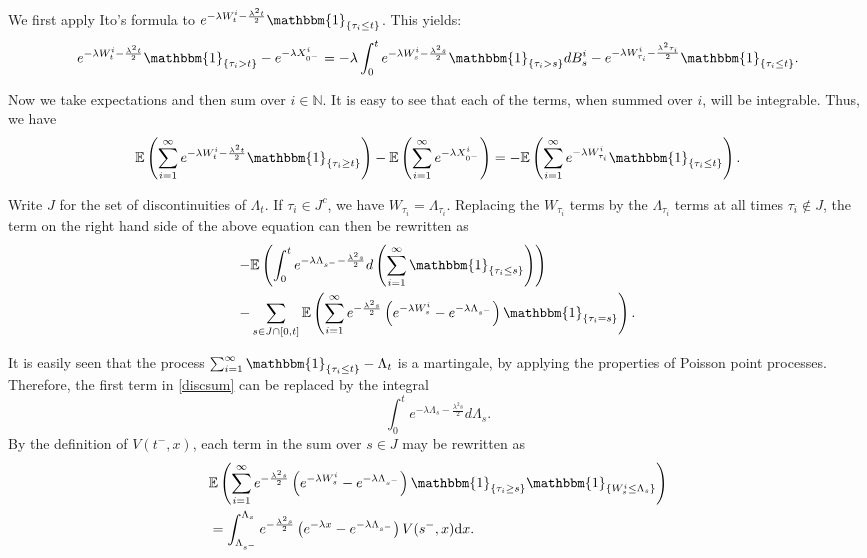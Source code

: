 \documentclass[11pt]{article}
\theoremstyle{plain}
\theoremstyle{remark}
\theoremstyle{definition}
\numberwithin{equation}{section}
\begin{document}
We first apply Ito's formula to $e^{-\lambda W_t^i-\frac{\lambda^2t}{2}}\mathbbm{1}_{\{\tau_i\leq t\}}$. This yields:
\begin{align*}
    e^{-\lambda W_t^i-\frac{\lambda^2t}{2}}\mathbbm{1}_{\{\tau_i>t\}}-e^{-\lambda X_{0^-}^i}=-\lambda \int_0^t e^{-\lambda W_s^i-\frac{\lambda^2s}{2}}\mathbbm{1}_{\{\tau_i> s\}}dB_s^i-e^{-\lambda W_{\tau_i}^i-\frac{\lambda^2\tau_i}{2}}\mathbbm{1}_{\{\tau_i\leq t\}}.
\end{align*}

Now we take expectations and then sum over $i\in \mathbb{N}$. It is easy to see that each of the terms, when summed over $i$, will be integrable. Thus, we have
\begin{align}
\label{itoterm2}
\mathbb{E}\left(\sum_{i=1}^\infty e^{-\lambda W_t^i-\frac{\lambda^2t}{2}}\mathbbm{1}_{\{\tau_i\geq t\}}\right)-\mathbb{E}\left(\sum_{i=1}^\infty e^{-\lambda X_{0^-}^i}\right)=-\mathbb{E}\left(\sum_{i=1
}^\infty e^{-\lambda W_{\tau_i}^i}\mathbbm{1}_{\{\tau_i\leq t\}}\right).
\end{align}

Write $J$ for the set of discontinuities of $\Lambda_t$.
If $\tau_i\in J^c$, we have $W_{\tau_i}=\Lambda_{\tau_i}$. Replacing the $W_{\tau_i}$ terms by the $\Lambda_{\tau_i}$ terms at all times $\tau_i\notin J$, the term on the right hand side of the above equation can then be rewritten as 
\begin{align}
\label{discsum}-&\mathbb{E}\left(\int_0^te^{-\lambda \Lambda_{s^-}-\frac{\lambda^2s}{2}}d\left(\sum_{i=1}^\infty \mathbbm{1}_{\{\tau_i\leq s\}}\right)\right)\\-&\sum_{s\in J\cap[0,t]}\mathbb{E}\left(\sum_{i=1}^\infty e^{-\frac{\lambda^2s}{2}}\left(e^{-\lambda W_{s}^i}-e^{-\lambda \Lambda_{s^-}}\right)\mathbbm{1}_{\{\tau_i =s\}}\right).\nonumber\end{align}

It is easily seen that the process $\sum_{i=1}^\infty \mathbbm{1}_{\{\tau_i\leq t\}}-\Lambda_t$ is a martingale, by applying the properties of Poisson point processes. Therefore, the first term in \eqref{discsum} can be replaced by the integral
$$\int_0^te^{-\lambda\Lambda_s-\frac{\lambda^2s}{2}}d\Lambda_s.$$
By the definition of $V(t^-,x)$, each term in the sum over $s\in J$ may be rewritten as 
\begin{align*}
    &\mathbb{E}\left(\sum_{i=1}^\infty e^{-\frac{\lambda^2s}{2}}\left(e^{-\lambda W_{s}^i}-e^{-\lambda \Lambda_{s^-}}\right)\mathbbm{1}_{\{\tau_i\geq s\}}\mathbbm{1}_{\{W_s^i\leq \Lambda_s\}}\right)\\
    &=\int_{\Lambda_{s^-}}^{\Lambda_s}e^{-\frac{\lambda^2s}{2}}\left(e^{-\lambda x}-e^{-\lambda \Lambda_{s^-}}\right)V(s^-,x)\textrm{d}x.
\end{align*}
\end{document}
